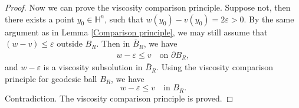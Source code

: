 \documentclass[10pt,a4paper]{amsart}
\begin{document}
\begin{proof}
    Now we can prove the viscosity comparison principle. Suppose not, then there exists a point $y_0 \in \mathbb{H}^n$, such that $w(y_0) - v(y_0) = 2\varepsilon > 0$. By the same argument as in Lemma \ref{Comparison principle}, we may still assume that $(w-v) \leqslant \varepsilon$ outside $B_R$. Then in $\overline{B}_R$, we have 
    \begin{align*}
        w - \varepsilon \leqslant v \quad \text{on } \partial B_R,
    \end{align*}
    and $w - \varepsilon$ is a viscosity subsolution in $\overline{B}_R$. Using the viscosity comparison principle for geodesic ball $B_R$, we have
    \[
    w - \varepsilon \leqslant v \quad \text{in } B_R.
    \]
    Contradiction. The viscosity comparison principle is proved.
\end{proof}
\end{document}
